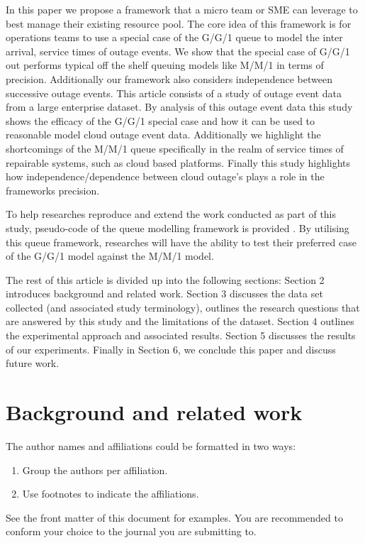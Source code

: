 \documentclass[5p]{elsarticle}
\begin{document}
In this paper we propose a framework that a micro team or SME can leverage to best manage their existing resource pool. The core idea of this framework is for operations teams to use a special case of the G/G/1 queue to model the inter arrival, service times of outage events. We show that the special case of G/G/1 out performs typical off the shelf queuing models like M/M/1 in terms of precision. Additionally our framework also considers independence between successive outage events. This article consists of a study of outage event data from a large enterprise dataset. By analysis of this outage event data this study shows the efficacy of the G/G/1 special case and how it can be used to reasonable model cloud outage event data. Additionally we highlight the shortcomings of the M/M/1 queue specifically in the realm of service times of repairable systems, such as cloud based platforms. Finally this study highlights how independence/dependence between cloud outage's plays a role in the frameworks precision.

To help researches reproduce and extend the work conducted as part of this study, pseudo-code of the queue modelling framework is provided . By utilising this queue framework, researches will have the ability to test their preferred case of the G/G/1 model against the M/M/1 model.

The rest of this article is divided up into the following sections: Section 2 introduces background and related work. Section 3 discusses the data set collected (and associated study terminology), outlines the research questions that are answered by this study and the limitations of the dataset. Section 4 outlines the experimental approach and associated results. Section 5 discusses the results of our experiments. Finally in Section 6, we conclude this paper and discuss future work.

\section{Background and related work}

The author names and affiliations could be formatted in two ways:
\begin{enumerate}[(1)]
\item Group the authors per affiliation.
\item Use footnotes to indicate the affiliations.
\end{enumerate}
See the front matter of this document for examples. You are recommended to conform your choice to the journal you are submitting to.
\end{document}
